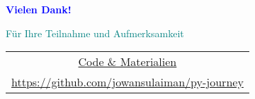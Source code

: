 \documentclass[aspectratio=169]{beamer} %
\begin{document}
\begin{frame}[fragile]
    \centering
    \vspace*{2cm}
    
    \Huge\textcolor{blue}{\textbf{Vielen Dank!}}
    
    \vspace{1.5cm}
    
    \Large\textcolor{teal}{Für Ihre Teilnahme und Aufmerksamkeit}
    
    \vspace{2cm}
    
    \footnotesize
    \begin{tabular}{c}
    \href{https://github.com/jowansulaiman/py-journey}{Code \& Materialien} \\
    \url{https://github.com/jowansulaiman/py-journey}
    \end{tabular}
    
\end{frame}
\end{document}
